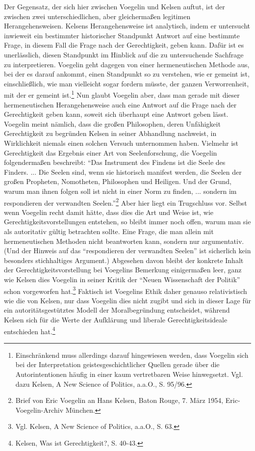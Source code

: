 \documentclass[12pt,a4paper,ngerman]{article}
\begin{document}
Der Gegensatz, der sich hier zwischen Voegelin und Kelsen auftut, ist der
zwischen zwei unterschiedlichen, aber gleichermaßen legitimen
Herangehensweisen.  Kelsens Herangehensweise ist analytisch, indem er
untersucht inwieweit ein bestimmter historischer Standpunkt Antwort auf eine
bestimmte Frage, in diesem Fall die Frage nach der Gerechtigkeit, geben kann.
Dafür ist es unerlässlich, diesen Standpunkt im Hinblick auf die zu
untersuchende Sachfrage zu interpretieren.  Voegelin geht dagegen von einer
hermeneutischen Methode aus, bei der es darauf ankommt, einen Standpunkt so zu
verstehen, wie er gemeint ist, einschließlich, wie man vielleicht sogar
fordern müsste, der ganzen Verworrenheit, mit der er gemeint
ist.\footnote{Einschränkend muss allerdings darauf hingewiesen werden, dass
  Voegelin sich bei der Interpretation geistesgeschichtlicher Quellen gerade
  über die Autorintentionen häufig in einer kaum vertretbaren Weise
  hinwegsetzt.  Vgl. dazu Kelsen, A New Science of Politics, a.a.O., S.
  95/96.} Nun glaubt Voegelin aber, dass man gerade mit dieser hermeneutischen
Herangehensweise auch eine Antwort auf die Frage nach der Gerechtigkeit geben
kann, soweit sich überhaupt eine Antwort geben lässt. Voegelin meint nämlich,
dass die großen Philosophen, deren Unfähigkeit Gerechtigkeit zu begründen
Kelsen in seiner Abhandlung nachweist, in Wirklichkeit niemals einen solchen
Versuch unternommen haben. Vielmehr ist Gerechtigkeit das Ergebnis einer Art
von Seelenforschung, die Voegelin folgendermaßen beschreibt: "`Das Instrument
des Findens ist die Seele des Finders. ... Die Seelen sind, wenn sie
historisch manifest werden, die Seelen der großen Propheten, Nomotheten,
Philosophen und Heiligen. Und der Grund, warum man ihnen folgen soll ist nicht
in einer Norm zu finden, ... sondern im respondieren der verwandten
Seelen."'\footnote{Brief von Eric Voegelin an Hans Kelsen, Baton Rouge, 7.
  März 1954, Eric-Voegelin-Archiv München.} Aber hier liegt ein Trugschluss
vor.  Selbst wenn Voegelin recht damit hätte, dass dies die Art und Weise ist,
wie Gerechtigkeitsvorstellungen entstehen, so bleibt immer noch offen, warum
man sie als autoritativ gültig betrachten sollte. Eine Frage, die man allein
mit hermeneutischen Methoden nicht beantworten kann, sondern nur argumentativ.
(Und der Hinweis auf das "`respondieren der verwandten Seelen"' ist sicherlich
kein besonders stichhaltiges Argument.) Abgesehen davon bleibt der konkrete
Inhalt der Gerechtigkeitsvorstellung bei Voegelins Bemerkung einigermaßen
leer, ganz wie Kelsen dies Voegelin in seiner Kritik der "`Neuen Wissenschaft
der Politik"' schon vorgeworfen hat.\footnote{Vgl.  Kelsen, A New Science of
  Politics, a.a.O., S. 63.} Faktisch ist Voegelins Ethik daher genauso
relativistisch wie die von Kelsen, nur dass Voegelin dies nicht zugibt und
sich in dieser Lage für ein autoritätsgestütztes Modell der Moralbegründung
entscheidet, während Kelsen sich für die Werte der Aufklärung und liberale
Gerechtigkeitsideale entschieden hat.\footnote{Kelsen, Was ist Gerechtigkeit?,
  S. 40-43.}
\end{document}
